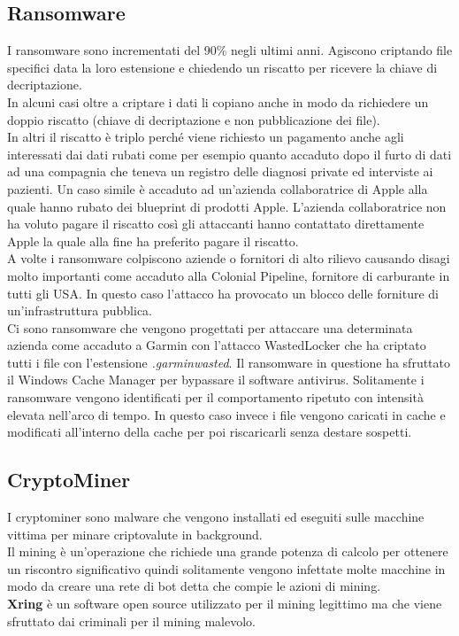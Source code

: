 \subsection{Ransomware}
I ransomware sono incrementati del 90\% negli ultimi anni. Agiscono criptando file specifici data la loro estensione e chiedendo un riscatto per ricevere la chiave di decriptazione.\\
In alcuni casi oltre a criptare i dati li copiano anche in modo da richiedere un doppio riscatto (chiave di decriptazione e non pubblicazione dei file).\\
In altri il riscatto è triplo perché viene richiesto un pagamento anche agli interessati dai dati rubati come per esempio quanto accaduto dopo il furto di dati ad una compagnia che teneva un registro delle diagnosi private ed interviste ai pazienti.
Un caso simile è accaduto ad un'azienda collaboratrice di Apple alla quale hanno rubato dei blueprint di prodotti Apple. L'azienda collaboratrice non ha voluto pagare il riscatto così gli attaccanti hanno contattato direttamente Apple la quale alla fine ha preferito pagare il riscatto.\\
A volte i ransomware colpiscono aziende o fornitori di alto rilievo causando disagi molto importanti come accaduto alla Colonial Pipeline, fornitore di carburante in tutti gli USA. In questo caso l'attacco ha provocato un blocco delle forniture di un'infrastruttura pubblica.\\
Ci sono ransomware che vengono progettati per attaccare una determinata azienda come accaduto a Garmin con l'attacco WastedLocker che ha criptato tutti i file con l'estensione \textit{.garminwasted}.
Il ransomware in questione ha sfruttato il Windows Cache Manager per bypassare il software antivirus.
Solitamente i ransomware vengono identificati per il comportamento  ripetuto con intensità elevata nell'arco di tempo.
In questo caso invece i file vengono caricati in cache e modificati all'interno della cache per poi riscaricarli senza destare sospetti.

\subsection{CryptoMiner}
I cryptominer sono malware che vengono installati ed eseguiti sulle macchine vittima per minare criptovalute in background.\\
Il mining è un'operazione che richiede una grande potenza di calcolo per ottenere un riscontro significativo quindi solitamente vengono infettate molte macchine in modo da creare una rete di bot detta  che compie le azioni di mining.\\
\textbf{Xring} è un software open source utilizzato per il mining legittimo ma che viene sfruttato dai criminali per il mining malevolo.

